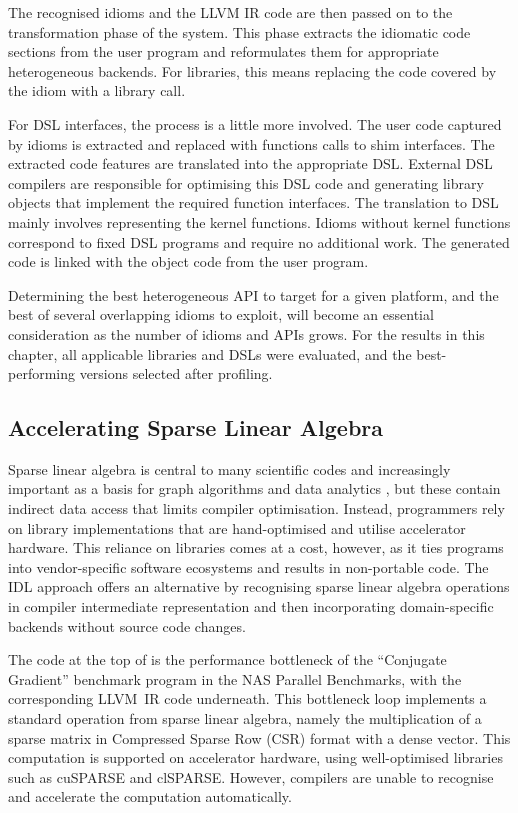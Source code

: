     The recognised idioms and the LLVM IR code are then passed on to the
    transformation phase of the system.
    This phase extracts the idiomatic code sections from the user program and
    reformulates them for appropriate heterogeneous backends.
    For libraries, this means replacing the code covered by the idiom with a
    library call. 

    For DSL interfaces, the process is a little more involved.
    The user code captured by idioms is extracted and replaced with functions
    calls to shim interfaces.
    The extracted code features are translated into the appropriate DSL.
    External DSL compilers are responsible for optimising this DSL code and
    generating library objects that implement the required function interfaces.
    The translation to DSL mainly involves representing the kernel functions.
    Idioms without kernel functions correspond to fixed DSL programs and
    require no additional work.
    The generated code is linked with the object code from the user program.

    Determining the best heterogeneous API to target for a given platform, and
    the best of several overlapping idioms to exploit, will become an essential
    consideration as the number of idioms and APIs grows.
    For the results in this chapter, all applicable libraries and DSLs were
    evaluated, and the best-performing versions selected after profiling.

\subsection{Accelerating Sparse Linear Algebra}

    Sparse linear algebra is central to many scientific codes and increasingly
    important as a basis for graph algorithms and data analytics
    \cite{Kepner2015GraphsMA}, but these contain indirect data access that
    limits compiler optimisation.
    Instead, programmers rely on library implementations that are hand-optimised
    and utilise accelerator hardware.
    This reliance on libraries comes at a cost, however, as it ties programs
    into vendor-specific software ecosystems and results in non-portable code.
    The IDL approach offers an alternative by recognising sparse linear algebra
    operations in compiler intermediate representation and then incorporating
    domain-specific backends without source code changes.

    The code at the top of  is the performance
    bottleneck of the ``Conjugate Gradient'' benchmark program in the NAS
    Parallel Benchmarks, with the corresponding LLVM~IR code underneath.
    This bottleneck loop implements a standard operation from sparse linear
    algebra, namely the multiplication of a sparse matrix in
    Compressed Sparse Row (CSR) format with a dense vector.
    This computation is supported on accelerator hardware, using well-optimised
    libraries such as cuSPARSE and clSPARSE.
    However, compilers are unable to recognise and accelerate the computation
    automatically.

